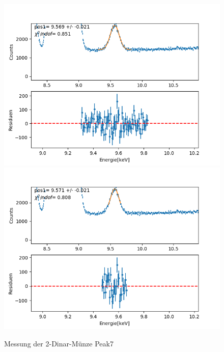 \documentclass[12pt,a4paper]{article}
\begin{document}
\begin{figure}[H]
\centering
\includegraphics[scale=0.49]{Bilder/roentgen_spektren/denar/den7_1.png}
\includegraphics[scale=0.49]{Bilder/roentgen_spektren/denar/den7_2.png}
\caption{Messung der 2-Dinar-Münze Peak7}
\end{figure}
\end{document}
